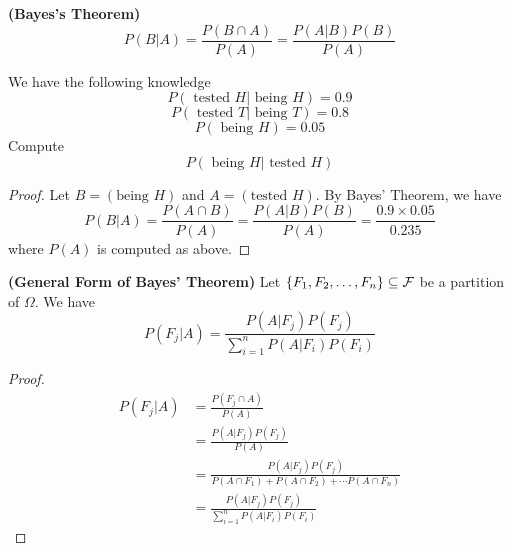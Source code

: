 \documentclass{report}
\begin{document}
\begin{theorem}
\textbf{(Bayes's Theorem)}
\begin{equation*}
P\left(B|A\right)=\frac{P\left(B\cap A \right)}{P\left(A \right)}=\frac{P\left(A|B \right)P\left(B \right)}{P\left(A \right)}
\end{equation*}
\end{theorem}
\begin{question}{}{}
We have the following knowledge 
\begin{equation*}
P\left(\text{ tested }H|\text{ being }H\right)=0.9
\end{equation*}
\begin{equation*}
P\left(\text{ tested }T|\text{ being }T\right)=0.8
\end{equation*}
\begin{equation*}
P\left(\text{ being }H \right)=0.05
\end{equation*}
Compute
\begin{equation*}
P\left(\text{ being }H|\text{ tested }H\right)
\end{equation*}
\end{question}
\begin{proof}
Let $B=\left(\text{being } H \right)$  and $A=\left(\text{tested } H \right)$. By Bayes' Theorem, we have 
\begin{equation*}
P\left(B|A \right)=\frac{P\left(A\cap B \right)}{P\left(A \right)}=\frac{P\left(A|B \right)P\left(B \right)}{P\left(A \right)}=\frac{0.9\times 0.05}{0.235}
\end{equation*}
where $P\left(A \right)$ is computed as above.
\end{proof}
\begin{theorem}
\textbf{(General Form of Bayes' Theorem)} Let $\{ F_1,F_2,\dots , F_n \}\subseteq \mathcal{F}$ be a partition of $\Omega$. We have 
\begin{equation*}
P\left(F_j|A \right)=\frac{P\left(A|F_j \right)P\left(F_j \right)}{\sum_{i=1}^n P\left(A|F_i \right)P\left(F_i \right)}
\end{equation*}
\end{theorem}
\begin{proof}
\begin{align*}
P\left(F_j|A \right)&=\frac{P\left(F_j\cap A \right)}{P\left(A \right)}\\
&=\frac{P\left(A|F_j \right)P\left(F_j \right)}{P\left(A \right)}\\
&=\frac{P\left(A|F_j \right)P\left(F_j \right)}{P\left(A\cap F_1 \right)+P\left(A\cap F_2 \right)+\cdots P\left(A\cap F_n \right)}\\
&=\frac{P\left(A|F_j \right)P\left(F_j \right)}{\sum_{i=1}^n P\left(A|F_i \right)P\left(F_i \right)}
\end{align*}
\end{proof}
\end{document}
